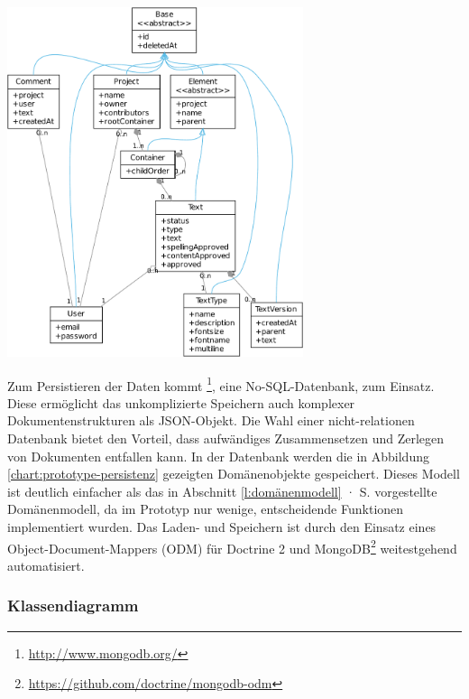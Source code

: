 \begin{center}
\includegraphics[width=0.65\textwidth]{media/prototyp-persistenz.pdf}
\label{chart:prototype-persistenz}
\end{center}

Zum Persistieren der Daten kommt \footnote{\url{http://www.mongodb.org/}}, eine No-SQL-Datenbank, zum Einsatz. Diese ermöglicht das unkomplizierte Speichern auch komplexer Dokumentenstrukturen als JSON-Objekt. Die Wahl einer nicht-relationen Datenbank bietet den Vorteil, dass aufwändiges Zusammensetzen und Zerlegen von Dokumenten entfallen kann. In der Datenbank werden die in Abbildung \ref{chart:prototype-persistenz} gezeigten Domänenobjekte gespeichert. Dieses Modell ist deutlich einfacher als das in Abschnitt \ref{l:domänenmodell} · S.\pageref{l:domänenmodell} vorgestellte Domänenmodell, da im Prototyp nur wenige, entscheidende Funktionen implementiert wurden. Das Laden- und Speichern ist durch den Einsatz eines Object-Document-Mappers (ODM) für Doctrine 2 und MongoDB\footnote{\url{https://github.com/doctrine/mongodb-odm}} weitestgehend automatisiert. 

\subsubsection{Klassendiagramm}

